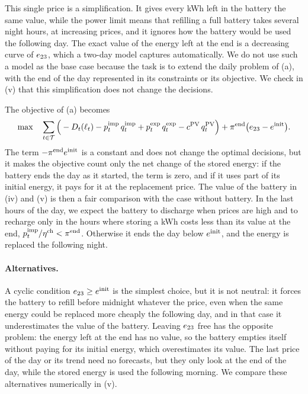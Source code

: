 This single price is a simplification. It gives every kWh left in the battery the same value,
while the power limit means that refilling a full battery takes several night hours, at
increasing prices, and it ignores how the battery would be used the following day. The exact
value of the energy left at the end is a decreasing curve of $\soc[23]$, which a two-day model
captures automatically. We do not use such a model as the base case because the task is to
extend the daily problem of (a), with the end of the day represented in its constraints or its
objective. We check in (v) that this simplification does not change the decisions.

The objective of (a) becomes
\begin{equation}
    \max \quad \sum_{t \in \T} \Big( - D_t(\load) - \pimp \, \qimp + \pexp \, \qexp
    - \cpv \, \pvprod \Big) + \piend \big( \soc[23] - \einit \big).
    \label{eq:g_end}
\end{equation}
The term $-\piend \einit$ is a constant and does not change the optimal decisions, but it makes
the objective count only the net change of the stored energy: if the battery ends the day as
it started, the term is zero, and if it uses part of its initial energy, it pays for it at the
replacement price. The value of the battery in (iv) and (v) is then a fair comparison with the
case without battery. In the last hours of the day, we expect the battery to discharge when
prices are high and to recharge only in the hours where storing a kWh costs less than its value
at the end, $\pimp / \etach < \piend$. Otherwise it ends the day below $\einit$, and the energy
is replaced the following night.

\paragraph{Alternatives.}
A cyclic condition $\soc[23] \geq \einit$ is the simplest choice, but it is not neutral: it
forces the battery to refill before midnight whatever the price, even when the same energy
could be replaced more cheaply the following day, and in that case it underestimates the value
of the battery.
Leaving $\soc[23]$ free has the opposite problem: the energy left at the end has no value, so
the battery empties itself without paying for its initial energy, which overestimates its
value. The last price of the day or its trend need no forecasts, but they only look at the end
of the day, while the stored energy is used the following morning. We compare these
alternatives numerically in (v).

